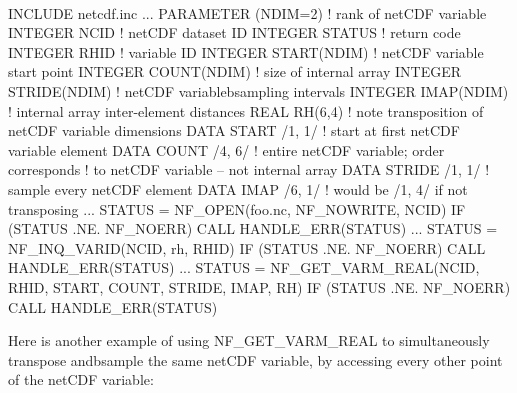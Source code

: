 

I\+N\+C\+L\+U\+DE \textquotesingle{}netcdf.\+inc\textquotesingle{} ... P\+A\+R\+A\+M\+E\+T\+ER (N\+D\+IM=2) ! rank of net\+C\+DF variable I\+N\+T\+E\+G\+ER N\+C\+ID ! net\+C\+DF dataset ID I\+N\+T\+E\+G\+ER S\+T\+A\+T\+US ! return code I\+N\+T\+E\+G\+ER R\+H\+ID ! variable ID I\+N\+T\+E\+G\+ER S\+T\+A\+R\+T(\+N\+D\+I\+M) ! net\+C\+DF variable start point I\+N\+T\+E\+G\+ER C\+O\+U\+N\+T(\+N\+D\+I\+M) ! size of internal array I\+N\+T\+E\+G\+ER S\+T\+R\+I\+D\+E(\+N\+D\+I\+M) ! net\+C\+DF variablebsampling intervals I\+N\+T\+E\+G\+ER I\+M\+A\+P(\+N\+D\+I\+M) ! internal array inter-\/element distances R\+E\+AL R\+H(6,4) ! note transposition of net\+C\+DF variable dimensions D\+A\+TA S\+T\+A\+RT /1, 1/ ! start at first net\+C\+DF variable element D\+A\+TA C\+O\+U\+NT /4, 6/ ! entire net\+C\+DF variable; order corresponds ! to net\+C\+DF variable -- not internal array D\+A\+TA S\+T\+R\+I\+DE /1, 1/ ! sample every net\+C\+DF element D\+A\+TA I\+M\+AP /6, 1/ ! would be /1, 4/ if not transposing ... S\+T\+A\+T\+US = N\+F\+\_\+\+O\+P\+EN(\textquotesingle{}foo.\+nc\textquotesingle{}, N\+F\+\_\+\+N\+O\+W\+R\+I\+TE, N\+C\+ID) IF (S\+T\+A\+T\+US .NE. N\+F\+\_\+\+N\+O\+E\+RR) C\+A\+LL H\+A\+N\+D\+L\+E\+\_\+\+E\+R\+R(\+S\+T\+A\+T\+U\+S) ... S\+T\+A\+T\+US = N\+F\+\_\+\+I\+N\+Q\+\_\+\+V\+A\+R\+ID(N\+C\+ID, \textquotesingle{}rh\textquotesingle{}, R\+H\+ID) IF (S\+T\+A\+T\+US .NE. N\+F\+\_\+\+N\+O\+E\+RR) C\+A\+LL H\+A\+N\+D\+L\+E\+\_\+\+E\+R\+R(\+S\+T\+A\+T\+U\+S) ... S\+T\+A\+T\+US = N\+F\+\_\+\+G\+E\+T\+\_\+\+V\+A\+R\+M\+\_\+\+R\+E\+A\+L(\+N\+C\+I\+D, R\+H\+I\+D, S\+T\+A\+R\+T, C\+O\+U\+N\+T, S\+T\+R\+I\+D\+E, I\+M\+A\+P, R\+H) IF (S\+T\+A\+T\+US .NE. N\+F\+\_\+\+N\+O\+E\+RR) C\+A\+LL H\+A\+N\+D\+L\+E\+\_\+\+E\+R\+R(\+S\+T\+A\+T\+U\+S)

Here is another example of using N\+F\+\_\+\+G\+E\+T\+\_\+\+V\+A\+R\+M\+\_\+\+R\+E\+AL to simultaneously transpose andbsample the same net\+C\+DF variable, by accessing every other point of the net\+C\+DF variable\+:

 

